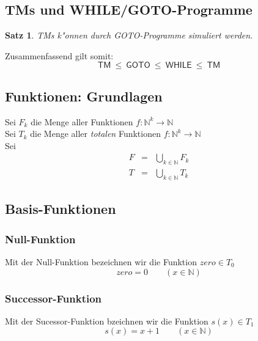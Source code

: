 \documentclass[german, 10pt, a4paper, twocolumn]{scrartcl}
\newtheorem{satz}{Satz}[section]
\theoremstyle{definition}
\theoremstyle{example}
\begin{document}
\subsection{TMs und WHILE/GOTO-Programme}

\begin{satz}
	TMs k"onnen durch GOTO-Programme simuliert werden.
\end{satz}

Zusammenfassend gilt somit:
\begin{displaymath}
	\textsf{TM} \ \leq \ \textsf{GOTO} \ \leq \ \textsf{WHILE} \ \leq \ \textsf{TM}
\end{displaymath}

\subsection{Funktionen: Grundlagen}

Sei $F_k$ die Menge aller Funktionen $f: \mathbb{N}^k \to \mathbb{N}$\\
Sei $T_k$ die Menge aller \textit{totalen} Funktionen $f: \mathbb{N}^k \to \mathbb{N}$\\
Sei
\begin{eqnarray*}
	F &	= &	\bigcup_{k\in \mathbb{N}} F_k \\
	T &	= &	\bigcup_{k \in \mathbb{N}} T_k
\end{eqnarray*}

\subsection{Basis-Funktionen}

\subsubsection{Null-Funktion}

Mit der Null-Funktion bezeichnen wir die Funktion $zero \in T_0$
\begin{displaymath}
	zero = 0 \qquad (x\in \mathbb{N})
\end{displaymath}

\subsubsection{Successor-Funktion}

Mit der Sucessor-Funktion bzeichnen wir die Funktion $s(x) \in T_1$
\begin{displaymath}
	s(x) = x + 1 \qquad (x \in \mathbb{N})
\end{displaymath}
\end{document}
